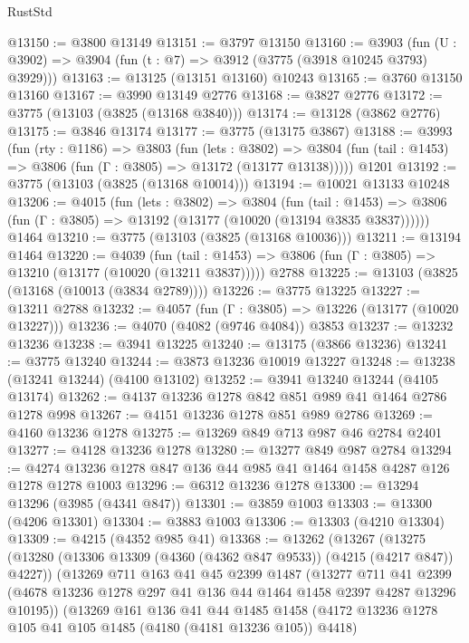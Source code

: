 \begin{lexlean}{RustStd}
\begin{coremodule}
@13150 := @3800 @13149
@13151 := @3797 @13150
@13160 := @3903
    (fun (U : @3902) => @3904 (fun (t : @7) => @3912 (@3775 (@3918 @10245 @3793) @3929)))
@13163 := @13125 (@13151 @13160) @10243
@13165 := @3760 @13150 @13160
@13167 := @3990 @13149 @2776
@13168 := @3827 @2776
@13172 := @3775 (@13103 (@3825 (@13168 @3840)))
@13174 := @13128 (@3862 @2776)
@13175 := @3846 @13174
@13177 := @3775 (@13175 @3867)
@13188 := @3993
    (fun (rty : @1186) =>
    @3803
      (fun (lets : @3802) =>
      @3804 (fun (tail : @1453) => @3806 (fun (Γ : @3805) => @13172 (@13177 @13138)))))
    @1201
@13192 := @3775 (@13103 (@3825 (@13168 @10014)))
@13194 := @10021 @13133 @10248
@13206 := @4015
    (fun (lets : @3802) =>
    @3804
      (fun (tail : @1453) =>
      @3806 (fun (Γ : @3805) => @13192 (@13177 (@10020 (@13194 @3835 @3837))))))
    @1464
@13210 := @3775 (@13103 (@3825 (@13168 @10036)))
@13211 := @13194 @1464
@13220 := @4039
    (fun (tail : @1453) => @3806 (fun (Γ : @3805) => @13210 (@13177 (@10020 (@13211 @3837)))))
    @2788
@13225 := @13103 (@3825 (@13168 (@10013 (@3834 @2789))))
@13226 := @3775 @13225
@13227 := @13211 @2788
@13232 := @4057 (fun (Γ : @3805) => @13226 (@13177 (@10020 @13227)))
@13236 := @4070 (@4082 (@9746 @4084)) @3853
@13237 := @13232 @13236
@13238 := @3941 @13225
@13240 := @13175 (@3866 @13236)
@13241 := @3775 @13240
@13244 := @3873 @13236 @10019 @13227
@13248 := @13238 (@13241 @13244) (@4100 @13102)
@13252 := @3941 @13240 @13244 (@4105 @13174)
@13262 := @4137 @13236 @1278 @842 @851 @989 @41 @1464 @2786 @1278 @998
@13267 := @4151 @13236 @1278 @851 @989 @2786
@13269 := @4160 @13236 @1278
@13275 := @13269 @849 @713 @987 @46 @2784 @2401
@13277 := @4128 @13236 @1278
@13280 := @13277 @849 @987 @2784
@13294 := @4274 @13236 @1278 @847 @136 @44 @985 @41 @1464 @1458 @4287 @126 @1278 @1278 @1003
@13296 := @6312 @13236 @1278
@13300 := @13294 @13296 (@3985 (@4341 @847))
@13301 := @3859 @1003
@13303 := @13300 (@4206 @13301)
@13304 := @3883 @1003
@13306 := @13303 (@4210 @13304)
@13309 := @4215 (@4352 @985 @41)
@13368 := @13262
    (@13267
      (@13275
        (@13280 (@13306 @13309 (@4360 (@4362 @847 @9533)) (@4215 (@4217 @847)) @4227))
        (@13269
          @711
          @163
          @41
          @45
          @2399
          @1487
          (@13277
            @711
            @41
            @2399
            (@4678 @13236 @1278 @297 @41 @136 @44 @1464 @1458 @2397 @4287 @13296 @10195))
          (@13269
            @161
            @136
            @41
            @44
            @1485
            @1458
            (@4172 @13236 @1278 @105 @41 @105 @1485 (@4180 (@4181 @13236 @105)) @4418)

\end{coremodule}
\end{lexlean}
